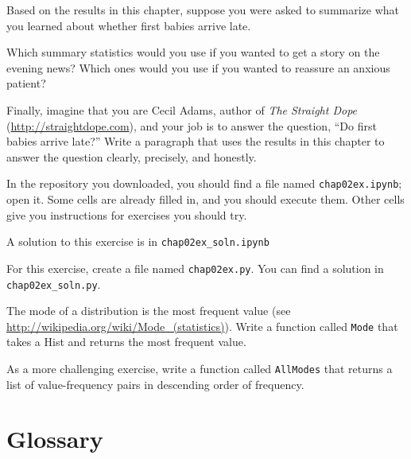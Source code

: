 \documentclass[12pt]{book}
\begin{document}
\begin{exercise}
Based on the results in this chapter, suppose you were asked to
summarize what you learned about whether first babies arrive late.

Which summary statistics would you use if you wanted to get a story
on the evening news?  Which ones would you use if you wanted to
reassure an anxious patient?

Finally, imagine that you are Cecil Adams, author of {\it The Straight
  Dope} (\url{http://straightdope.com}), and your job is to answer the
question, ``Do first babies arrive late?''  Write a paragraph that
uses the results in this chapter to answer the question clearly,
precisely, and honestly.

\end{exercise}

\begin{exercise}
In the repository you downloaded, you should find a file named
\verb"chap02ex.ipynb"; open it.  Some cells are already filled in, and
you should execute them.  Other cells give you instructions for
exercises you should try.

A solution to this exercise is in \verb"chap02ex_soln.ipynb"
\end{exercise}


\begin{exercise}
For this exercise, create a file named {\tt chap02ex.py}.  You can
find a solution in \verb"chap02ex_soln.py".

The mode of a distribution is the most frequent value (see
\url{http://wikipedia.org/wiki/Mode_(statistics)}).  Write a function
called {\tt Mode} that takes a Hist and returns the most
frequent value.

As a more challenging exercise, write a function called {\tt AllModes}
that returns a list of value-frequency pairs in descending order of
frequency.
\end{exercise}



\section{Glossary}
\end{document}
